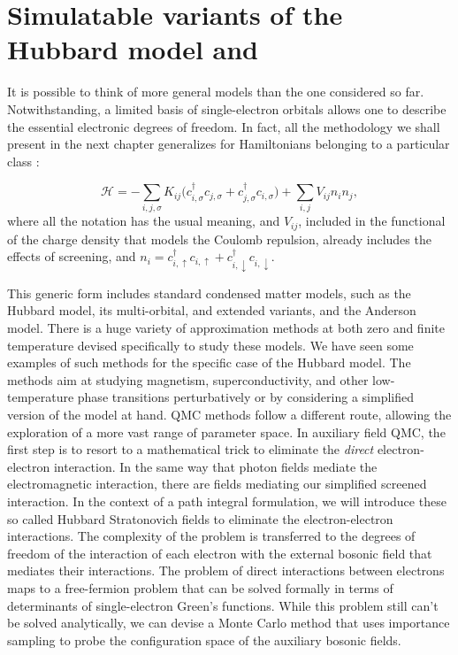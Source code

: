 \section{Simulatable variants of the Hubbard model and }\label{sec:variants}

It is possible to think of more general  models than the one considered so far.
Notwithstanding, a limited basis of single-electron orbitals allows one to describe the essential electronic degrees of freedom.
In fact, all the methodology we shall present in the next chapter generalizes for Hamiltonians belonging to a particular class \cite{hanke_electronic_nodate}:

\begin{equation}\label{eq:variantsForm}
\mathcal{H} = - \sum_{i, j, \sigma} K_{ij} \bigg( c_{i, \sigma}^\dagger c_{j, \sigma} + c_{j, \sigma}^\dagger c_{i, \sigma} \bigg) + \sum_{i, j} V_{ij} n_i n_j ,
\end{equation}
where all the notation has the usual meaning, and $V_{ij}$, included in the functional of the charge density that models the Coulomb repulsion, already includes the effects of screening, and $n_i = c_{i,\uparrow}^\dagger c_{i,\uparrow} + c_{i,\downarrow}^\dagger c_{i,\downarrow}$.

This generic form includes standard condensed matter models, such as the Hubbard model, its multi-orbital, and extended variants, and the Anderson model.
There is a huge variety of approximation methods at both zero and finite temperature devised specifically to study these models.
We have seen some examples of such methods for the specific case of the Hubbard model.
The methods aim at studying magnetism, superconductivity, and other low-temperature phase transitions perturbatively or by considering a  simplified version of the model at hand.
\ac{QMC} methods follow a different route, allowing the exploration of a more vast range of parameter space.
In auxiliary field \ac{QMC}, the first step is to resort to a mathematical trick to eliminate the \emph{direct} electron-electron interaction.
In the same way that photon fields mediate the electromagnetic interaction, there are fields mediating our simplified screened interaction.
In the context of a path integral formulation, we will introduce these so called Hubbard Stratonovich fields to eliminate the electron-electron interactions.
The complexity of the problem is transferred to the degrees of freedom of the interaction of each electron with the external bosonic field that mediates their interactions.
The problem of direct interactions between electrons maps to a free-fermion problem that can be solved formally in terms of determinants of single-electron Green's functions.
While this problem still can't be solved analytically, we can devise a Monte Carlo method that uses importance sampling to probe the configuration space of the auxiliary bosonic fields.

